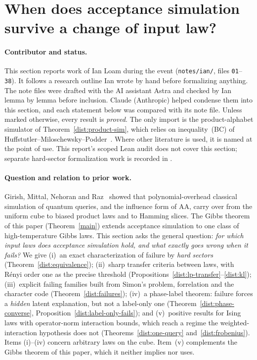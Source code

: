 \documentclass[11pt]{article}
\theoremstyle{definition}\newtheorem{definition}[theorem]{Definition}
\theoremstyle{remark}\newtheorem{remark}[theorem]{Remark}
\begin{document}
\providecommand{\Cov}{\operatorname{Cov}}
\providecommand{\R}{\mathbb R}
\providecommand{\Hard}{\operatorname{Hard}}

\section{When does acceptance simulation survive a change of input law?}\label{sec:distributional}

\paragraph{Contributor and status.}
This section reports work of Ian Loam during the event (\texttt{notes/ian/},
files \texttt{01}--\texttt{38}). It follows a research outline Ian wrote by hand
before formalizing anything. The note files were drafted with the AI assistant
Astra and checked by Ian lemma by lemma before inclusion. Claude (Anthropic)
helped condense them into this section, and each statement below was compared
with its note file. Unless marked otherwise, every result is \emph{proved}. The
only import is the product-alphabet simulator of
Theorem~\ref{dist:product-sim}, which relies on inequality~(BC) of
Huffstutler--Miloschewsky--Podder~\cite{HMP26}. Where other literature is used,
it is named at the point of use. This report's scoped Lean audit does not cover
this section; separate hard-sector formalization work is recorded in
.

\paragraph{Question and relation to prior work.}
Girish, Mittal, Nehoran and Raz~\cite{GMNR26} showed that polynomial-overhead
classical simulation of quantum queries, and the influence form of AA, carry
over from the uniform cube to biased product laws and to Hamming slices. The
Gibbs theorem of this paper (Theorem~\ref{main}) extends acceptance simulation to
one class of high-temperature Gibbs laws. This section asks the general
question: \emph{for which input laws does acceptance simulation hold, and what
exactly goes wrong when it fails?} We give
(i)~an exact characterization of failure by \emph{hard sectors}
(Theorem~\ref{dist:equivalence});
(ii)~sharp transfer criteria between laws, with Rényi order one as the precise
threshold (Propositions~\ref{dist:lp-transfer}--\ref{dist:kl});
(iii)~explicit failing families built from Simon's problem, forrelation and the
character code (Theorem~\ref{dist:failures});
(iv)~a phase-label theorem: failure forces a \emph{hidden} latent explanation,
but not a label-only one (Theorem~\ref{dist:phase-converse},
Proposition~\ref{dist:label-only-fails}); and
(v)~positive results for Ising laws with operator-norm interaction bounds,
which reach a regime the weighted-interaction hypothesis does not
(Theorems~\ref{dist:one-query} and~\ref{dist:frobenius}).
Items (i)--(iv) concern arbitrary laws on the cube. Item~(v) complements the
Gibbs theorem of this paper, which it neither implies nor uses.
\end{document}
